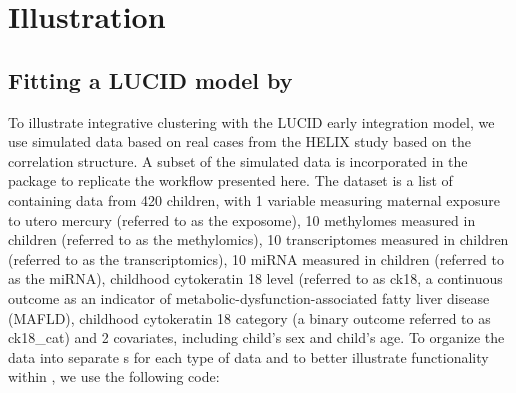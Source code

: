 \section{Illustration} \label{sec3}


\subsection{Fitting a LUCID model by } \label{sec3.1}

To illustrate integrative clustering with the LUCID early integration model, we use simulated data based on real cases from the HELIX study based on the correlation structure. A subset of the simulated data is incorporated in the  package to replicate the workflow presented here. The dataset is a list of  containing data from 420 children, with 1 variable measuring maternal exposure to utero mercury (referred to as the exposome), 10 methylomes measured in children (referred to as the methylomics), 10 transcriptomes measured in children (referred to as the transcriptomics), 10 miRNA measured in children (referred to as the miRNA), childhood cytokeratin 18 level (referred to as ck18, a continuous outcome as an indicator of metabolic-dysfunction-associated fatty liver disease (MAFLD), childhood cytokeratin 18 category (a binary outcome referred to as ck18\_cat) and 2 covariates, including child's sex and child's age. To organize the data into separate s for each type of data and to better illustrate functionality within , we use the following code:


